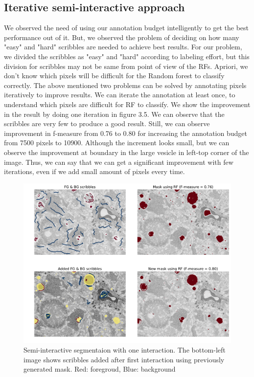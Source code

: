 \subsection{Iterative semi-interactive approach}
We observed the need of using our annotation budget intelligently to get the best performance out of it. But, we observed the problem of deciding on how many "easy" and "hard" scribbles are needed to achieve best results. For our problem, we divided the scribbles as "easy" and "hard" according to labeling effort, but this division for scribbles may not be same from point of view of the RFs. Apriori, we don't know which pixels will be difficult for the Random forest to classify correctly. The above mentioned two problems can be solved by annotating pixels iteratively to improve results. We can iterate the annotation at least once, to understand which pixels are difficult for RF to classify. We show the improvement in the result by doing one iteration in figure 3.5. We can observe that the scribbles are very few to produce a good result. Still, we can observe improvement in f-measure from 0.76 to 0.80 for increasing the annotation budget from 7500 pixels to 10900. Although the increment looks small, but we can observe the improvement at boundary in the large vesicle in left-top corner of the image. Thus, we can say that we can get a significant improvement with few iterations, even if we add small amount of pixels every time.
\begin{figure}[h!] \label{fig:semi-rf}
 \includegraphics[width=1.0\linewidth]{figures/semi_inter_rf.pdf}
\caption{Semi-interactive segmentaion with one interaction. The bottom-left image shows scribbles added after first interaction using previously generated mask. Red: foregroud, Blue: background}
\end{figure}


